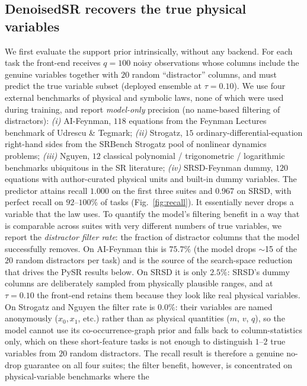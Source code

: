 \documentclass[11pt]{article}
\begin{document}
\subsection*{DenoisedSR recovers the true physical variables}
We first evaluate the support prior intrinsically, without any backend. For each
task the front-end receives $q=100$ noisy observations whose columns include the
genuine variables together with $20$ random ``distractor'' columns, and must
predict the true variable subset (deployed ensemble at $\tau=0.10$). We use four
external benchmarks of physical and symbolic laws, none of which were used during
training, and report \emph{model-only} precision (no name-based filtering of
distractors):
\emph{(i)} AI-Feynman, $118$ equations from the Feynman Lectures benchmark of
Udrescu \& Tegmark\cite{udrescu2020aifeynman};
\emph{(ii)} Strogatz, $15$ ordinary-differential-equation right-hand sides from
the SRBench Strogatz pool of nonlinear dynamics
problems\cite{lafuente2024srbench};
\emph{(iii)} Nguyen, $12$ classical polynomial / trigonometric / logarithmic
benchmarks ubiquitous in the SR literature\cite{uy2011nguyen};
\emph{(iv)} SRSD-Feynman dummy, $120$ equations with author-curated physical
units and built-in dummy variables\cite{matsubara2024srsd}.
The predictor attains recall $1.000$ on the first three suites and $0.967$ on
SRSD, with perfect recall on $92$--$100\%$ of tasks (Fig.~\ref{fig:recall}). It
essentially never drops a variable that the law uses. To quantify the model's
filtering benefit in a way that is comparable across suites with very different
numbers of true variables, we report the \emph{distractor filter rate}: the
fraction of distractor columns that the model successfully removes. On
AI-Feynman this is $75.7\%$ (the model drops $\sim$15 of the $20$ random
distractors per task) and is the source of the search-space reduction that
drives the PySR results below. On SRSD it is only $2.5\%$: SRSD's dummy columns
are deliberately sampled from physically plausible ranges, and at $\tau=0.10$
the front-end retains them because they look like real physical variables. On
Strogatz and Nguyen the filter rate is $0.0\%$: their variables are named
anonymously ($x_0, x_1$, etc.) rather than as physical quantities ($m$, $v$,
$q$), so the model cannot use its co-occurrence-graph prior and falls back to
column-statistics only, which on these short-feature tasks is not enough to
distinguish $1$--$2$ true variables from $20$ random distractors. The recall
result is therefore a genuine no-drop guarantee on all four suites; the filter
benefit, however, is concentrated on physical-variable benchmarks where the
\end{document}
